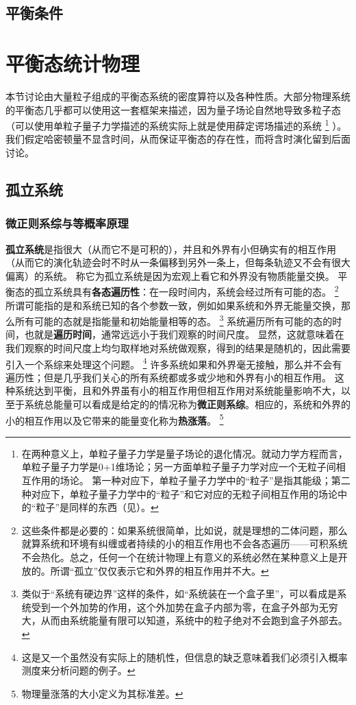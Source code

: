 \documentclass[hyperref, UTF8, a4paper]{ctexart}
\renewcommand{\autoref}{\prettyref}
\begin{document}
\subsection{平衡条件}

\section{平衡态统计物理}\label{sec:equilibrium-system}

本节讨论由大量粒子组成的平衡态系统的密度算符以及各种性质。大部分物理系统的平衡态几乎都可以使用这一套框架来描述，因为量子场论自然地导致多粒子态（可以使用单粒子量子力学描述的系统实际上就是使用薛定谔场描述的系统%
\footnote{在两种意义上，单粒子量子力学是量子场论的退化情况。就动力学方程而言，单粒子量子力学是0+1维场论；另一方面单粒子量子力学对应一个无粒子间相互作用的场论。
第一种对应下，单粒子量子力学中的“粒子”是指其能级；第二种对应下，单粒子量子力学中的“粒子”和它对应的无粒子间相互作用的场论中的“粒子”是同样的东西（见\autoref{note:second-quantization}）。}
）。
我们假定哈密顿量不显含时间，从而保证平衡态的存在性，而将含时演化留到后面讨论。

\subsection{孤立系统}

\subsubsection{微正则系综与等概率原理}

\textbf{孤立系统}是指很大（从而它不是可积的），并且和外界有小但确实有的相互作用（从而它的演化轨迹会时不时从一条偏移到另外一条上，但每条轨迹又不会有很大偏离）的系统。
称它为孤立系统是因为宏观上看它和外界没有物质能量交换。
平衡态的孤立系统具有\textbf{各态遍历性}：在一段时间内，系统会经过所有可能的态。%
\footnote{这些条件都是必要的：如果系统很简单，比如说，就是理想的二体问题，那么就算系统和环境有纠缠或者持续的小的相互作用也不会各态遍历——可积系统不会热化。总之，任何一个在统计物理上有意义的系统必然在某种意义上是开放的。所谓“孤立”仅仅表示它和外界的相互作用并不大。}%
所谓可能指的是和系统已知的各个参数一致，例如如果系统和外界无能量交换，那么所有可能的态就是指能量和初始能量相等的态。%
\footnote{类似于“系统有硬边界”这样的条件，如“系统装在一个盒子里”，可以看成是系统受到一个外加势的作用，这个外加势在盒子内部为零，在盒子外部为无穷大，从而由系统能量有限可以知道，系统中的粒子绝对不会跑到盒子外部去。}%
系统遍历所有可能的态的时间，也就是\textbf{遍历时间}，通常远远小于我们观察的时间尺度。
显然，这就意味着在我们观察的时间尺度上均匀取样地对系统做观察，得到的结果是随机的，因此需要引入一个系综来处理这个问题。%
\footnote{这是又一个虽然没有实际上的随机性，但信息的缺乏意味着我们必须引入概率测度来分析问题的例子。}%
许多系统如果和外界毫无接触，那么并不会有遍历性；但是几乎我们关心的所有系统都或多或少地和外界有小的相互作用。
这种系统达到平衡，且和外界虽有小的相互作用但相互作用对系统能量影响不大，以至于系统总能量可以看成是给定的的情况称为\textbf{微正则系综}。相应的，系统和外界的小的相互作用以及它带来的能量变化称为\textbf{热涨落}。%
\footnote{物理量涨落的大小定义为其标准差。}%
\end{document}
